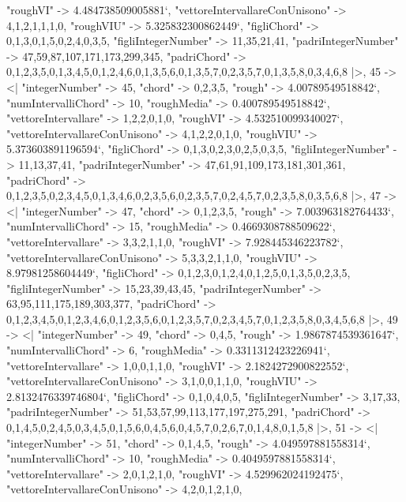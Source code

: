 \documentclass[
]{article}
\begin{document}
\begin{DatasetVerbatim}
    "roughVI" -> 4.484738509005881`,
    "vettoreIntervallareConUnisono" -> {4,1,2,1,1,1,0},
    "roughVIU" -> 5.325832300862449`,
    "figliChord" -> {{0,1,3},{0,1,5},{0,2,4},{0,3,5}},
    "figliIntegerNumber" -> {11,35,21,41},
    "padriIntegerNumber" -> {47,59,87,107,171,173,299,345},
    "padriChord" -> {{0,1,2,3,5},{0,1,3,4,5},{0,1,2,4,6},{0,1,3,5,6},{0,1,3,5,7},{0,2,3,5,7},{0,1,3,5,8},{0,3,4,6,8}}
  |>,
  45 -> <|
    "integerNumber" -> 45,
    "chord" -> {0,2,3,5},
    "rough" -> 4.00789549518842`,
    "numIntervalliChord" -> 10,
    "roughMedia" -> 0.400789549518842`,
    "vettoreIntervallare" -> {1,2,2,0,1,0},
    "roughVI" -> 4.532510099340027`,
    "vettoreIntervallareConUnisono" -> {4,1,2,2,0,1,0},
    "roughVIU" -> 5.373603891196594`,
    "figliChord" -> {{0,1,3},{0,2,3},{0,2,5},{0,3,5}},
    "figliIntegerNumber" -> {11,13,37,41},
    "padriIntegerNumber" -> {47,61,91,109,173,181,301,361},
    "padriChord" -> {{0,1,2,3,5},{0,2,3,4,5},{0,1,3,4,6},{0,2,3,5,6},{0,2,3,5,7},{0,2,4,5,7},{0,2,3,5,8},{0,3,5,6,8}}
  |>,
  47 -> <|
    "integerNumber" -> 47,
    "chord" -> {0,1,2,3,5},
    "rough" -> 7.003963182764433`,
    "numIntervalliChord" -> 15,
    "roughMedia" -> 0.4669308788509622`,
    "vettoreIntervallare" -> {3,3,2,1,1,0},
    "roughVI" -> 7.928445346223782`,
    "vettoreIntervallareConUnisono" -> {5,3,3,2,1,1,0},
    "roughVIU" -> 8.97981258604449`,
    "figliChord" -> {{0,1,2,3},{0,1,2,4},{0,1,2,5},{0,1,3,5},{0,2,3,5}},
    "figliIntegerNumber" -> {15,23,39,43,45},
    "padriIntegerNumber" -> {63,95,111,175,189,303,377},
    "padriChord" -> {{0,1,2,3,4,5},{0,1,2,3,4,6},{0,1,2,3,5,6},{0,1,2,3,5,7},{0,2,3,4,5,7},{0,1,2,3,5,8},{0,3,4,5,6,8}}
  |>,
  49 -> <|
    "integerNumber" -> 49,
    "chord" -> {0,4,5},
    "rough" -> 1.9867874539361647`,
    "numIntervalliChord" -> 6,
    "roughMedia" -> 0.3311312423226941`,
    "vettoreIntervallare" -> {1,0,0,1,1,0},
    "roughVI" -> 2.1824272900822552`,
    "vettoreIntervallareConUnisono" -> {3,1,0,0,1,1,0},
    "roughVIU" -> 2.8132476339746804`,
    "figliChord" -> {{0,1},{0,4},{0,5}},
    "figliIntegerNumber" -> {3,17,33},
    "padriIntegerNumber" -> {51,53,57,99,113,177,197,275,291},
    "padriChord" -> {{0,1,4,5},{0,2,4,5},{0,3,4,5},{0,1,5,6},{0,4,5,6},{0,4,5,7},{0,2,6,7},{0,1,4,8},{0,1,5,8}}
  |>,
  51 -> <|
    "integerNumber" -> 51,
    "chord" -> {0,1,4,5},
    "rough" -> 4.049597881558314`,
    "numIntervalliChord" -> 10,
    "roughMedia" -> 0.4049597881558314`,
    "vettoreIntervallare" -> {2,0,1,2,1,0},
    "roughVI" -> 4.529962024192475`,
    "vettoreIntervallareConUnisono" -> {4,2,0,1,2,1,0},

\end{DatasetVerbatim}
\end{document}
